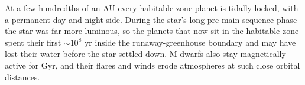 \begin{solution}
At a few hundredths of an AU every habitable-zone planet is tidally locked, with a permanent day and night side.
During the star's long pre-main-sequence phase the star was far more luminous, so the planets that now sit in the habitable zone spent their first $\sim 10^8$ yr inside the runaway-greenhouse boundary and may have lost their water before the star settled down.
M dwarfs also stay magnetically active for Gyr, and their flares and winds erode atmospheres at such close orbital distances.
\end{solution}
